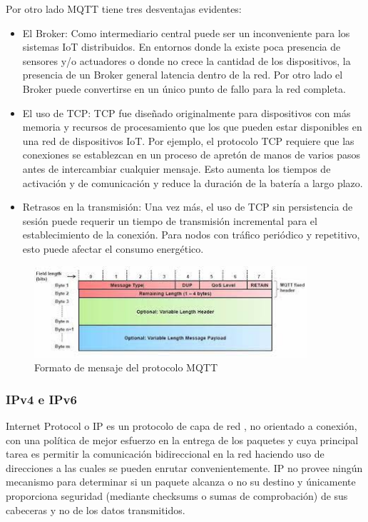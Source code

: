 Por otro lado MQTT tiene tres desventajas evidentes:
\begin{itemize}
\item El Broker: Como intermediario central puede ser un inconveniente para los sistemas IoT distribuidos. En entornos donde la existe poca presencia de sensores y/o actuadores o donde no crece la cantidad de los dispositivos, la presencia de un Broker general latencia dentro de la red. Por otro lado el Broker puede convertirse en un único punto de fallo para la red completa.
\item El uso de TCP: TCP fue diseñado originalmente para dispositivos con más memoria y recursos de procesamiento que los que pueden estar disponibles en una red de dispositivos IoT. Por ejemplo, el protocolo TCP requiere que las conexiones se establezcan en un proceso de apretón de manos de varios pasos antes de intercambiar cualquier mensaje. Esto aumenta los tiempos de activación y de comunicación y reduce la duración de la batería a largo plazo.
\item Retrasos en la transmisión: Una vez más, el uso de TCP sin persistencia de sesión puede requerir un tiempo de transmisión incremental para el establecimiento de la conexión. Para nodos con tráfico periódico y repetitivo, esto puede afectar el consumo energético.
\end{itemize}

\begin{figure}[ht]
\centering
\includegraphics[width=0.9\textwidth]{./Figuras/mqtt_header.jpeg}
\caption{\label{fig:mqttheader}Formato de mensaje del protocolo MQTT}
\vspace*{-10pt}
\end{figure}


\subsubsection{IPv4 e IPv6}
Internet Protocol o IP es un protocolo de capa de red , no orientado a conexión, con una política de mejor esfuerzo en la entrega de los paquetes y cuya principal tarea es permitir la comunicación bidireccional en la red haciendo uso de direcciones a las cuales se pueden enrutar convenientemente. IP no provee ningún mecanismo para determinar si un paquete alcanza o no su destino y únicamente proporciona seguridad (mediante checksums o sumas de comprobación) de sus cabeceras y no de los datos transmitidos. \\

